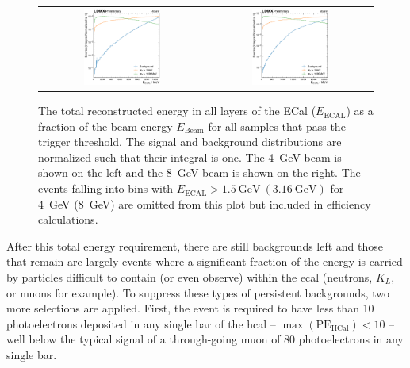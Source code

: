 \begin{figure}[htb]
    \centering
    \begin{tabular}{cc}
         \includegraphics[width=0.48\textwidth]{figures/ldmx/analysis/energy-after-trigger-4gev.pdf}
         &
         \includegraphics[width=0.48\textwidth]{figures/ldmx/analysis/energy-after-trigger-8gev.pdf}
    \end{tabular}
    \caption{
    The total reconstructed energy in all layers of the ECal ($E_\text{ECAL}$) as a fraction of the beam energy
    $E_\text{Beam}$ for all samples that pass the trigger threshold.
    The signal and background distributions are normalized such that their integral is one.
    The \qty{4}{\GeV} beam is shown on the left and the \qty{8}{\GeV} beam is shown
    on the right.
    The events falling into bins with $E_\text{ECAL} > \qty{1.5}{\GeV}~(\qty{3.16}{\GeV})$
    for \qty{4}{\GeV} (\qty{8}{GeV}) are omitted from this plot but included in efficiency calculations.
    }
    \label{fig:energy-after-trigger}
\end{figure}

After this total energy requirement, there are still backgrounds left and those that remain are largely
events where a significant fraction of the energy is carried by particles difficult to contain (or even observe)
within the \ac{ecal} (neutrons, $K_L$, or muons for example).
To suppress these types of persistent backgrounds, two more selections are applied.
First, the event is required to have less than 10 photoelectrons deposited in any single bar of the \ac{hcal}
-- $\max(\mathrm{PE}_\mathrm{HCal}) < 10$ -- well below the typical signal of a through-going muon of 80
photoelectrons in any single bar.

